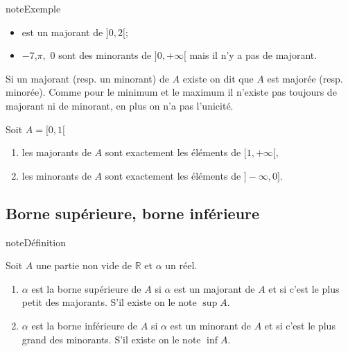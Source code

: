 \documentclass[letterpaper,10pt,french]{jupyterBook}
\begin{document}
\begin{sphinxadmonition}{note}{Exemple}
\begin{itemize}
\item {} 
 est un majorant de \(]0, 2[ ;\)

\item {} 
\sphinxAtStartPar
−7,\(\pi,\) 0 sont des minorants de \(]0,+\infty[\) mais il n’y a pas de majorant.

\end{itemize}

\sphinxAtStartPar
Si un majorant (resp. un minorant) de \(A\) existe on dit que \(A\) est majorée (resp. minorée).
Comme pour le minimum et le maximum il n’existe pas toujours de majorant ni de minorant, en plus on n’a pas
l’unicité.

\sphinxAtStartPar
Soit \(A =[0,1[\)
\begin{enumerate}
%
\item {} 
\sphinxAtStartPar
les majorants de \(A\) sont exactement les éléments de \([1,+\infty[,\)

\item {} 
\sphinxAtStartPar
les minorants de \(A\) sont exactement les éléments de \(]−\infty,0].\)

\end{enumerate}
\end{sphinxadmonition}


\subsection{Borne supérieure, borne inférieure}
\label{\detokenize{proprties:borne-superieure-borne-inferieure}}
\begin{sphinxadmonition}{note}{Définition}

\sphinxAtStartPar
Soit \(A\) une partie non vide de \(\mathbb{R}\) et \(\alpha\) un réel.
\begin{enumerate}
%
\item {} 
\sphinxAtStartPar
\(\alpha\) est la borne supérieure de \(A\) si \(\alpha\) est un majorant de \(A\) et si c’est le plus petit des majorants. S’il existe on le
note \(\sup A.\)

\item {} 
\sphinxAtStartPar
\(\alpha\) est la borne inférieure de \(A\) si \(\alpha\) est un minorant de \(A\) et si c’est le plus grand des minorants. S’il existe on le
note \(\inf A.\)

\end{enumerate}
\end{sphinxadmonition}
\end{document}
